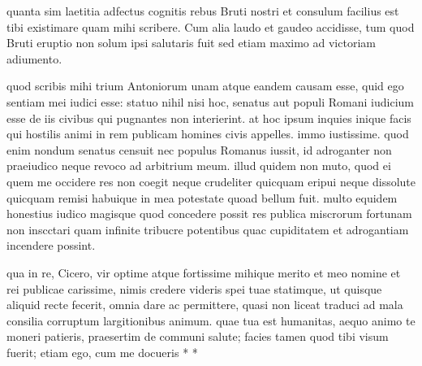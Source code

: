 


 quanta sim laetitia adfectus cognitis rebus Bruti nostri et consulum facilius est tibi existimare quam mihi scribere. Cum alia laudo et gaudeo accidisse, tum quod Bruti eruptio non solum ipsi salutaris fuit sed etiam maximo ad victoriam adiumento.

 quod scribis mihi trium Antoniorum unam atque eandem causam esse, quid ego sentiam mei iudici esse: statuo nihil nisi hoc, senatus aut populi Romani iudicium esse de iis civibus qui pugnantes non interierint. at hoc ipsum inquies inique facis qui hostilis animi in rem publicam homines civis appelles. immo iustissime. quod enim nondum senatus censuit nec populus Romanus iussit, id adroganter non praeiudico neque revoco ad arbitrium meum. illud quidem non muto, quod ei quem me occidere res non coegit neque crudeliter quicquam eripui neque dissolute quicquam remisi habuique in mea potestate quoad bellum fuit. multo equidem honestius iudico magisque quod concedere possit res publica miscrorum fortunam non inscctari quam infinite tribucre potentibus quac cupiditatem et adrogantiam incendere possint.

 qua in re, Cicero, vir optime atque fortissime mihique merito et meo nomine et rei publicae carissime, nimis credere videris spei tuae statimque, ut quisque aliquid recte fecerit, omnia dare ac permittere, quasi non liceat traduci ad mala consilia corruptum largitionibus animum. quae tua est humanitas, aequo animo te moneri patieris, praesertim de communi salute; facies tamen quod tibi visum fuerit; etiam ego, cum me docueris * *
